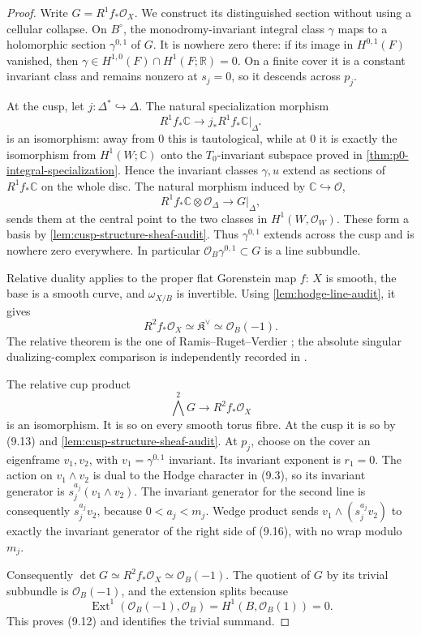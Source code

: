 \begin{proof}
Write \(G=R^1f_*\mathcal O_X\).  We construct its distinguished section
without using a cellular collapse.  On \(B^\circ\), the monodromy-invariant
integral class \(\gamma\) maps to a holomorphic section
\(\gamma^{0,1}\) of \(G\).  It is nowhere zero there: if its image in
\(H^{0,1}(F)\) vanished, then
\(\gamma\in H^{1,0}(F)\cap H^1(F;\mathbb R)=0\).  On a finite cover it is
a constant invariant class and remains nonzero at \(s_j=0\), so it
descends across \(p_j\).

At the cusp, let \(j:\Delta^*\hookrightarrow\Delta\).  The natural
specialization morphism
\[
 R^1f_*\mathbb C\longrightarrow
 j_*R^1f_*\mathbb C|_{\Delta^*}
\]
is an isomorphism: away from \(0\) this is tautological, while at \(0\) it
is exactly the isomorphism from \(H^1(W;\mathbb C)\) onto the
\(T_0\)-invariant subspace proved in
\cref{thm:p0-integral-specialization}.  Hence the invariant classes
\(\gamma,u\) extend as sections of \(R^1f_*\mathbb C\) on the whole disc.
The natural morphism induced by \(\mathbb C\hookrightarrow\mathcal O\),
\[
 R^1f_*\mathbb C\otimes\mathcal O_\Delta
 \longrightarrow G|_\Delta,
\]
sends them at the central point to the two classes in
\(H^1(W,\mathcal O_W)\).  These form a basis by
\cref{lem:cusp-structure-sheaf-audit}.  Thus
\(\gamma^{0,1}\) extends across the cusp and is nowhere zero everywhere.
In particular \(\mathcal O_B\gamma^{0,1}\subset G\) is a line subbundle.

Relative duality applies to the proper flat Gorenstein map \(f\): \(X\) is
smooth, the base is a smooth curve, and \(\omega_{X/B}\) is invertible.
Using \cref{lem:hodge-line-audit}, it gives
\[
 R^2f_*\mathcal O_X\simeq\mathfrak K^\vee
 \simeq\mathcal O_B(-1).
\tag{9.15}
\]
The relative theorem is the one of Ramis--Ruget--Verdier
\cite[pp.~261--283]{RamisRugetVerdier1971}; the absolute singular
dualizing-complex comparison is independently recorded in
\cite[Theorems~1--2 and Proposition~2]{RamisRuget1970}.

The relative cup product
\[
 \bigwedge^2G\longrightarrow R^2f_*\mathcal O_X
\tag{9.16}
\]
is an isomorphism.  It is so on every smooth torus fibre.  At the cusp it
is so by (9.13) and \cref{lem:cusp-structure-sheaf-audit}.  At \(p_j\),
choose on the cover an eigenframe \(v_1,v_2\), with
\(v_1=\gamma^{0,1}\) invariant.  Its invariant exponent is \(r_1=0\).
The action on \(v_1\wedge v_2\) is dual to the Hodge character in (9.3),
so its invariant generator is \(s_j^{a_j}(v_1\wedge v_2)\).
The invariant generator for the second line is consequently
\(s_j^{a_j}v_2\), because \(0<a_j<m_j\).  Wedge product sends
\(v_1\wedge(s_j^{a_j}v_2)\) to exactly the invariant generator of the
right side of (9.16), with no wrap modulo \(m_j\).

Consequently
\(\det G\simeq R^2f_*\mathcal O_X\simeq\mathcal O_B(-1)\).  The quotient
of \(G\) by its trivial subbundle is \(\mathcal O_B(-1)\), and the
extension splits because
\[
 \operatorname{Ext}^1(\mathcal O_B(-1),\mathcal O_B)
 =H^1(B,\mathcal O_B(1))=0.
\]
This proves (9.12) and identifies the trivial summand.
\end{proof}
